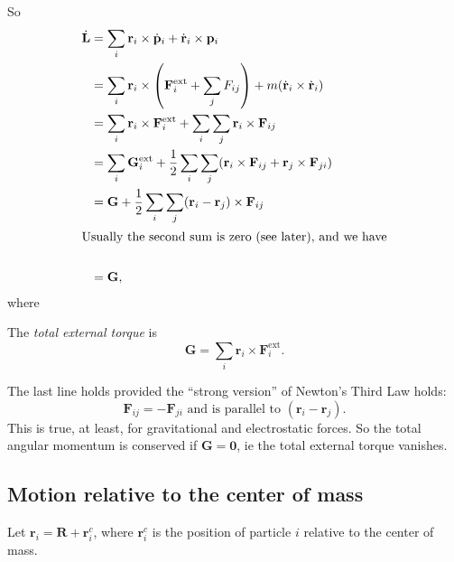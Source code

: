 \documentclass[a4paper]{article}
\begin{document}
So
\begin{align*}
  \dot{\mathbf{L}} &= \sum_i \mathbf{r}_i \times \dot{\mathbf{p}}_i + \dot{\mathbf{r}}_i \times \mathbf{p}_i\\
  &= \sum_i \mathbf{r}_i \times \left(\mathbf{F}_i^{\text{ext}} + \sum_j F_{ij}\right) + m(\dot{\mathbf{r}}_i\times \dot{\mathbf{r}}_i)\\
  &= \sum_i \mathbf{r}_i\times \mathbf{F}_i^{\text{ext}} + \sum_i \sum_j \mathbf{r}_i \times \mathbf{F}_{ij}\\
  &= \sum_i \mathbf{G}_i^{\text{ext}} + \frac{1}{2}\sum_i\sum_j (\mathbf{r}_i \times \mathbf{F}_{ij} + \mathbf{r}_j\times \mathbf{F}_{ji})\\
  &= \mathbf{G} + \frac{1}{2}\sum_i\sum_j(\mathbf{r}_i - \mathbf{r}_j)\times \mathbf{F}_{ij}\\
  \intertext{Usually the second sum is zero (see later), and we have}\\
  &= \mathbf{G},
\end{align*}
where
\begin{defi}
  The \emph{total external torque} is
  \[
    \mathbf{G} = \sum_i \mathbf{r}_i \times \mathbf{F}_i^{\text{ext}}.
  \]
\end{defi}
The last line holds provided the ``strong version'' of Newton's Third Law holds:
\[
  \mathbf{F}_{ij} = -\mathbf{F}_{ji}\text{ and is parallel to }(\mathbf{r}_i - \mathbf{r}_j).
\]
This is true, at least, for gravitational and electrostatic forces. So the total angular momentum is conserved if $\mathbf{G} = \mathbf{0}$, ie the total external torque vanishes.

\subsection{Motion relative to the center of mass}
Let $\mathbf{r}_i = \mathbf{R} + \mathbf{r}_i^c$, where $\mathbf{r}_i^c$ is the position of particle $i$ relative to the center of mass.
\end{document}

